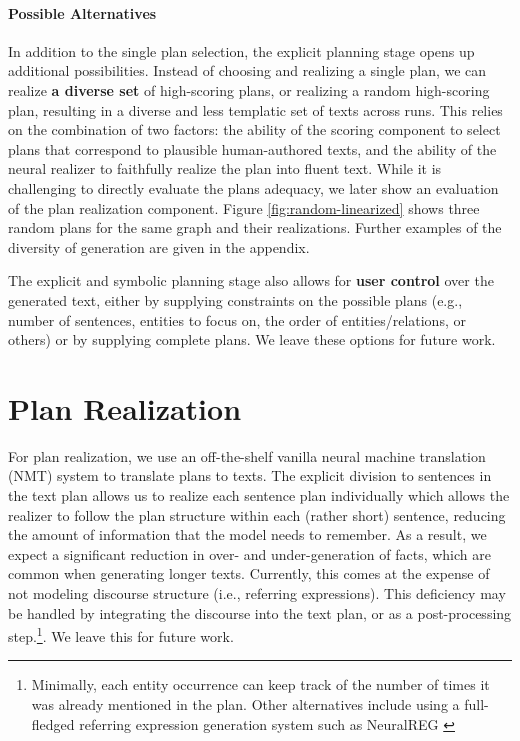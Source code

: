 \documentclass[11pt,a4paper]{article}
\begin{document}
\begin{figure*}[ht]
    \caption{Three random linearized plans for the same input graph, and their text realizations. All taken from the top 10\% scoring plans. (a) structures the output as a single sentence, while (b) and (c) as two sentences. The second sentence in (b) puts emphasis on Bionico being a dessert, while in (c) the emphasis is on the ingredients.}
    \label{fig:random-linearized}
\end{figure*}
 
\paragraph{Possible Alternatives} In addition to the single plan selection, the explicit planning stage opens up additional possibilities. Instead of choosing and realizing a single plan, we can realize \textbf{a diverse set} of high-scoring plans, or realizing a random high-scoring plan, resulting in a diverse and less templatic set of texts across runs. 
This relies on the combination of two factors: the ability of the scoring component to select plans that correspond to plausible human-authored texts, and the ability of the neural realizer to faithfully realize the plan into fluent text. While it is challenging to directly evaluate the plans adequacy, we later show an evaluation of the plan realization component. Figure \ref{fig:random-linearized} shows three random plans for the same graph and their realizations. Further examples of the diversity of generation are given in the appendix. 

The explicit and symbolic planning stage also allows for \textbf{user control} over the generated text, either by supplying constraints on the possible plans (e.g., number of sentences, entities to focus on, the order of entities/relations, or others) or by supplying complete plans. We leave these options for future work.


\section{Plan Realization}\label{sec:plan-neural} 

For plan realization, we use an off-the-shelf vanilla neural machine translation (NMT) system to translate plans to texts.
The explicit division to sentences in the text plan allows us to realize each sentence plan individually which allows the realizer to follow the plan structure within each (rather short) sentence, reducing the amount of information that the model needs to remember. As a result, we expect a significant reduction in over- and under-generation of facts, which are common when generating longer texts. Currently, this comes at the expense of not modeling discourse structure (i.e., referring expressions). This deficiency may be handled by integrating the discourse into the text plan, or as a post-processing step.\footnote{Minimally, each entity occurrence can keep track of the number of times it was already mentioned in the plan. Other alternatives include using a full-fledged referring expression generation system such as NeuralREG \cite{ferreira2018neuralreg}}. We leave this for future work.
\end{document}
